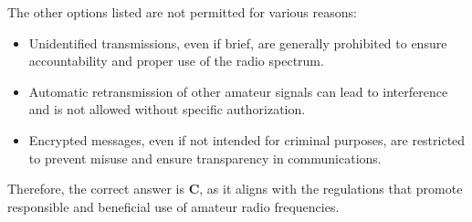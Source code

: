 The other options listed are not permitted for various reasons:
\begin{itemize}
    \item Unidentified transmissions, even if brief, are generally prohibited to ensure accountability and proper use of the radio spectrum.
    \item Automatic retransmission of other amateur signals can lead to interference and is not allowed without specific authorization.
    \item Encrypted messages, even if not intended for criminal purposes, are restricted to prevent misuse and ensure transparency in communications.
\end{itemize}

Therefore, the correct answer is \textbf{C}, as it aligns with the regulations that promote responsible and beneficial use of amateur radio frequencies.

